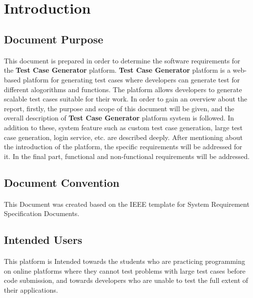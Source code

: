 \documentclass{article}
\begin{document}
\section{Introduction}
\subsection{Document Purpose}
\paragraph{}
This document is prepared in order to determine the software requirements for the
\textbf{Test Case Generator} platform. \textbf{Test Case Generator} platform is a
web-based platform for generating test cases where developers can generate test for
different alogorithms and functions. The platform allows developers to generate
scalable test cases suitable for their work. In order to gain an overview about
the report, firstly, the purpose and scope of this document will be given, and the
overall description of \textbf{Test Case Generator} platform system is followed. In
addition to these, system feature such as custom test case generation, large test case
generation, login service, etc. are described deeply. After mentioning about the
introduction of the platform, the specific requirements will be addressed for it.
In the final part, functional and non-functional requirements will be addressed.

\subsection{Document Convention}
\paragraph{}
This Document was created based on the IEEE template for System Requirement Specification
Documents.

\subsection{Intended Users}
\paragraph{}
This platform is Intended towards the students who are practicing programming on online
platforms where they cannot test problems with large test cases before code submission,
and towards developers who are unable to test the full extent of their applications.
\end{document}

